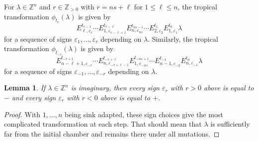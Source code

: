 \documentclass{amsart}
\newtheorem{lemma}[theorem]{Lemma}
\numberwithin{theorem}{section}
\newcommand{\ZZ}{\mathbb{Z}}
\begin{document}
  For $\lambda\in\ZZ^n$ and $r\in\ZZ_{>0}$ with $r=ns+\ell$ for $1\le\ell\le n$, the tropical transformation $\phi_{t_r}(\lambda)$ is given by
  \[
    E^{t_{r-1}}_{\ell,\varepsilon_r} \cdots E^{t_{r-\ell}}_{1,\varepsilon_{r-\ell+1}} E^{t_{ns-1}}_{n,\varepsilon_{ns}} \cdots E^{t_1}_{2,\varepsilon_2} E^{t_0}_{1,\varepsilon_1} \lambda
  \]
  for a sequence of signs $\varepsilon_1,\ldots,\varepsilon_r$ depending on $\lambda$.
  Similarly, the tropical transformation $\phi_{t_{-r}}(\lambda)$ is given by
  \[
    E^{t_{-r+1}}_{n-\ell+1,\varepsilon_{-r}} \cdots E^{t_{-r+\ell}}_{n,\varepsilon_{-r+\ell-1}} E^{t_{-ns+1}}_{1,\varepsilon_{-ns}} \cdots E^{t_{-1}}_{n-1,\varepsilon_{-2}} E^{t_0}_{n,\varepsilon_{-1}} \lambda
  \]
  for a sequence of signs $\varepsilon_{-1},\ldots,\varepsilon_{-r}$ depending on $\lambda$.
  \begin{lemma}
    \label{lem:imaginary mutations}
    If $\lambda\in\ZZ^n$ is imaginary, then every sign $\varepsilon_r$ with $r>0$ above is equal to $-$ and every sign $\varepsilon_r$ with $r<0$ above is equal to $+$.
  \end{lemma}
  \begin{proof}
    With $1,\ldots,n$ being sink adapted, these sign choices give the most complicated transformation at each step.
    That should mean that $\lambda$ is sufficiently far from the initial chamber and remains there under all mutations.
  \end{proof}
\end{document}
